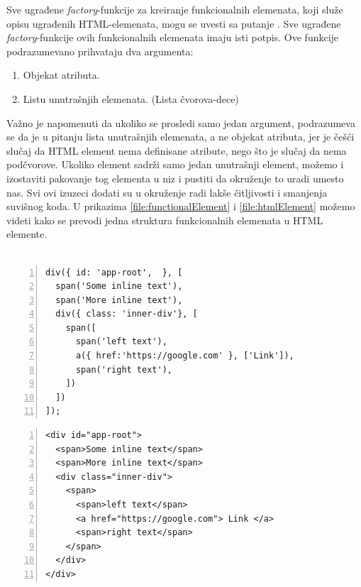 \documentclass[12pt,oneside]{memoir}
\newcommand{\code}[1]{\allowbreak{\colorbox{codegray}{\texttt{\scalebox{0.9}{#1}}}}}%
\begin{document}
Sve ugrađene \emph{factory}-funkcije za kreiranje funkcionalnih elemenata, koji služe opisu ugrađenih HTML-elemenata, mogu se uvesti sa putanje \code{"pure-framework/html"}.
Sve ugrađene \emph{factory}-funkcije ovih funkcionalnih elemenata imaju isti potpis.
Ove funkcije podrazumevano prihvataju dva argumenta:
\begin{enumerate}
  \item Objekat atributa. \label{enum:attr-list}
  \item Listu unutrašnjih elemenata. (Lista čvorova-dece)
\end{enumerate}
Važno je napomenuti da ukoliko se prosledi samo jedan argument, podrazumeva se da je u pitanju lista unutrašnjih elemenata,
a ne objekat atributa, jer je češći slučaj da HTML element nema definisane atribute, nego što je slučaj da nema podčvorove.
Ukoliko element sadrži samo jedan unutrašnji element, možemo i izostaviti pakovanje tog elementa u niz i pustiti da okruženje
to uradi umesto nas.
Svi ovi izuzeci dodati su u okruženje radi lakše čitljivosti i smanjenja suvišnog koda. U prikazima \ref{file:functionalElement} i \ref{file:htmlElement}
možemo videti kako se prevodi jedna
struktura funkcionalnih elemenata u HTML elemente.
\\
\\
\noindent\begin{minipage}[b]{.46\textwidth}
\begin{lstlisting}[style=jsStyle, numbers=left, numberstyle=\tiny, caption={Funkcionalni element},label=file:functionalElement]
div({ id: 'app-root',  }, [
  span('Some inline text'),
  span('More inline text'),
  div({ class: 'inner-div'}, [
    span([
      span('left text'),
      a({ href:'https://google.com' }, ['Link']),
      span('right text'),
    ])
  ])
]);
\end{lstlisting}
\end{minipage}
\hfill
\begin{minipage}[b]{.46\textwidth}
\begin{lstlisting}[style=htmlStyle, numbers=left, numberstyle=\tiny, caption={Rezultujući HTML},label=file:htmlElement]
<div id="app-root">
  <span>Some inline text</span>
  <span>More inline text</span>
  <div class="inner-div">
    <span>
      <span>left text</span>
      <a href="https://google.com"> Link </a>
      <span>right text</span>
    </span>
  </div>
</div>
\end{lstlisting}
\end{minipage}
\end{document}
